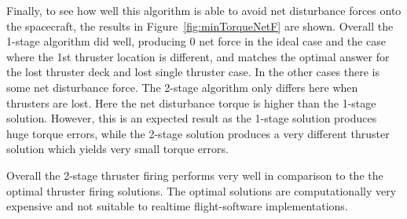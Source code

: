 Finally, to see how well this algorithm is able to avoid net disturbance forces onto the spacecraft, the results in Figure~\ref{fig:minTorqueNetF} are shown.  Overall the 1-stage algorithm did well, producing 0 net force in the ideal case and the case where the 1st thruster location is different, and matches the optimal answer for the lost thruster deck and lost single thruster case.  In the other cases there is some net disturbance force.  The 2-stage algorithm only differs here when thrusters are lost.  Here the net disturbance torque is higher than the 1-stage solution.  However, this is an expected result as the 1-stage solution produces huge torque errors, while the 2-stage solution produces a very different thruster solution which yields very small torque errors. 

Overall the 2-stage thruster firing performs very well in comparison to the the optimal thruster firing solutions.  The optimal solutions are computationally very expensive and not suitable to realtime flight-software implementations.  








